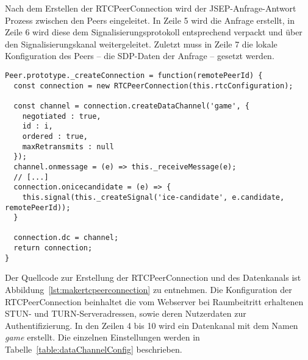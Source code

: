 Nach dem Erstellen der RTCPeerConnection wird der \acs{JSEP}-Anfrage-Antwort Prozess zwischen den Peers eingeleitet. In Zeile 5 wird die Anfrage erstellt, in Zeile 6 wird diese dem Signalisierungsprotokoll entsprechend verpackt und über den Signalisierungskanal weitergeleitet. Zuletzt muss in Zeile 7 die lokale Konfiguration des Peers -- die SDP-Daten der Anfrage -- gesetzt werden.

\vspace{5pt}
\lstset{language=js, style=STYLE_CODE_JS}
\begin{minipage}{\textwidth}
\begin{singlespace}
\begin{lstlisting}[caption={Erstellen von Verbindungen und Datenkanälen -- peer.js}, captionpos=b, label={lst:makertcpeerconnection}]
Peer.prototype._createConnection = function(remotePeerId) {
  const connection = new RTCPeerConnection(this.rtcConfiguration);

  const channel = connection.createDataChannel('game', {
    negotiated : true,
    id : i,
    ordered : true,
    maxRetransmits : null
  });
  channel.onmessage = (e) => this._receiveMessage(e);
  // [...]
  connection.onicecandidate = (e) => {
    this.signal(this._createSignal('ice-candidate', e.candidate, remotePeerId));
  }
 
  connection.dc = channel;
  return connection;
}
\end{lstlisting}
\end{singlespace}
\end{minipage}

Der Quellcode zur Erstellung der RTCPeerConnection und des Datenkanals ist Abbildung~\ref{lst:makertcpeerconnection} zu entnehmen. Die Konfiguration der RTCPeerConnection beinhaltet die vom Webserver bei Raumbeitritt erhaltenen STUN- und TURN-Serveradressen, sowie deren Nutzerdaten zur Authentifizierung. In den Zeilen 4 bis 10 wird ein Datenkanal mit dem Namen \textit{game} erstellt. Die einzelnen Einstellungen werden in Tabelle~\ref{table:dataChannelConfig} beschrieben.


